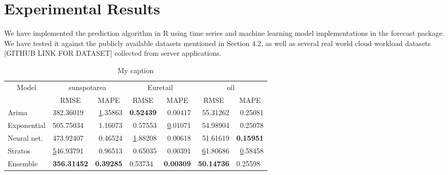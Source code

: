 
\section{Experimental Results}

We have implemented the prediction algorithm in R using time series and machine learning model implementations in the forecast package. We have tested it against the publicly available datasets mentioned in Section 4.2, as well as several real world cloud workload datasets [GITHUB LINK FOR DATASET] collected from server applications.

\begin{table}[]
\centering
\caption{My caption}
\label{my-label}
\begin{tabular}{|l|l|r|r|r|r|r|}
\hline
\multicolumn{1}{|c|}{\multirow{2}{*}{Model}} & \multicolumn{2}{c|}{sunspotarea}                                  & \multicolumn{2}{c|}{Euretail}                                        & \multicolumn{2}{c|}{oil}                                              \\ \cline{2-7} 
\multicolumn{1}{|c|}{}                       & \multicolumn{1}{c|}{RMSE} & \multicolumn{1}{c|}{MAPE}             & \multicolumn{1}{c|}{RMSE}    & \multicolumn{1}{c|}{MAPE}             & \multicolumn{1}{c|}{RMSE}              & \multicolumn{1}{c|}{MAPE}    \\ \hline
Arima                                        & 382.36019                 & {\ul 1.35863}                         & \textbf{0.52439}             & 0.00417                               & 55.31262                               & 0.25081                      \\ \hline
Exponential                                  & 505.75034                 & 1.16073                               & 0.57553                      & {\ul 0.01071}                         & 54.98904                               & 0.25078                      \\ \hline
Neural net.                                  & 473.92407                 & 0.46524                               & {\ul 1.88208}                & 0.00618                               & 51.61619                               & \textbf{0.15951}             \\ \hline
Stratos                                      & {\ul 546.93791}           & 0.96513                               & 0.65035                      & 0.00391                               & {\ul 61.80686}                         & {\ul 0.58458}                \\ \hline
Ensemble                                     & \textbf{356.31452}        & \multicolumn{1}{l|}{\textbf{0.39285}} & \multicolumn{1}{l|}{0.53734} & \multicolumn{1}{l|}{\textbf{0.00309}} & \multicolumn{1}{l|}{\textbf{50.14736}} & \multicolumn{1}{l|}{0.25598} \\ \hline
\end{tabular}
\end{table}


